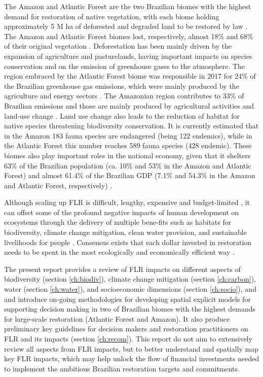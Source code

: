%
\indent The Amazon and Atlantic Forest are the two Brazilian biomes with the highest demand for restoration of native vegetation, with each biome holding approximately 5 M ha of deforested and degraded land to be restored by law \citep{Brasil2017}. The Amazon and Atlantic Forest biomes lost, respectively, almost 18\% and 68\% of their original vegetation \citep{MAPBIOMAS2018Collection2000-2016}. Deforestation has been mainly driven by the expansion of agriculture and pasturelands, having important impacts on species conservation and on the emission of greenhouse gases to the atmosphere. The region embraced by the Atlantic Forest biome was responsible in 2017 for 24\% of the Brazilian greenhouse gas emissions, which were mainly produced by the agriculture and energy sectors \citep{SEEG2018TabelaDados}. The Amazonian region contributes to 33\% of Brazilian emissions and those are mainly produced by agricultural activities and land-use change \citep{SEEG2018TabelaDados}. Land use change also leads to the reduction of habitat for native species threatening biodiversity conservation. It is currently estimated that in the Amazon 183 fauna species are endangered (being 122 endemics), while in the Atlantic Forest this number reaches 589 fauna species (428 endemic). These biomes also play important roles in the national economy, given that it shelters 63\% of the Brazilian population (ca. 10\% and 53\% in the Amazon and Atlantic Forest) and almost 61.4\% of the Brazilian GDP (7.1\% and 54.3\% in the Amazon and Atlantic Forest, respectively) \citep{20182018Contas2018}. 

Although scaling up FLR is difficult, lengthy, expensive and budget-limited \citep{Crouzeilles2016}, it can offset some of the profound negative impacts of human development on ecosystems through the delivery of multiple bene-fits such as habitats for biodiversity, climate change mitigation, clean water provision, and sustainable livelihoods for people \citep{Chazdon2016c, Holl2017}. Consensus exists that each dollar invested in restoration needs to be spent in the most ecologically and economically efficient way \cite{Ding2017, Verdone2017}. 

The present report provides a review of FLR impacts on different aspects of biodiversity (section \ref{ch:biodiv}), climate change mitigation (section \ref{ch:carbon}), water (section \ref{ch:water}), and socioeconomic dimensions (section \ref{ch:socio}), and and introduce on-going methodologies for developing spatial explicit models for supporting decision making in two of Brazilian biomes with the highest demands for large-scale restoration (Atlantic Forest and Amazon). It also produce preliminary key guidelines for decision makers and restoration practitioners on FLR and its impacts (section \ref{ch:recom}). This report do not aim to extensively review all aspects from FLR impacts, but to better understand and spatially map key FLR impacts, which may help unlock the flow of financial investments needed to implement the ambitious Brazilian restoration targets and commitments.
